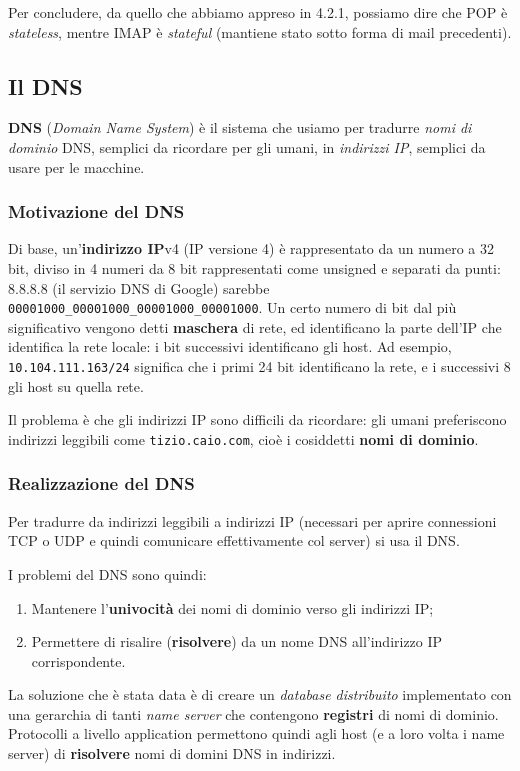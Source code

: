 \documentclass[a4paper,11pt]{article}
\begin{document}
Per concludere, da quello che abbiamo appreso in 4.2.1, possiamo dire che POP è \textit{stateless}, mentre IMAP è \textit{stateful} (mantiene stato sotto forma di mail precedenti). 

\subsection{Il DNS}
\textbf{DNS} (\textit{Domain Name System}) è il sistema che usiamo per tradurre \textit{nomi di dominio} DNS, semplici da ricordare per gli umani, in \textit{indirizzi IP}, semplici da usare per le macchine.

\subsubsection{Motivazione del DNS}
Di base, un'\textbf{indirizzo IP}v4 (IP versione 4) è rappresentato da un numero a 32 bit, diviso in 4 numeri da 8 bit rappresentati come unsigned e separati da punti: 8.8.8.8 (il servizio DNS di Google) sarebbe \lstinline|00001000_00001000_00001000_00001000|.
Un certo numero di bit dal più significativo vengono detti \textbf{maschera} di rete, ed identificano la parte dell'IP che identifica la rete locale: i bit successivi identificano gli host.
Ad esempio, \lstinline|10.104.111.163/24| significa che i primi 24 bit identificano la rete, e i successivi 8 gli host su quella rete. 

Il problema è che gli indirizzi IP sono difficili da ricordare: gli umani preferiscono indirizzi leggibili come \lstinline|tizio.caio.com|, cioè i cosiddetti \textbf{nomi di dominio}.

\subsubsection{Realizzazione del DNS}

Per tradurre da indirizzi leggibili a indirizzi IP (necessari per aprire connessioni TCP o UDP e quindi comunicare effettivamente col server) si usa il DNS.

I problemi del DNS sono quindi:
\begin{enumerate}
	\item Mantenere l'\textbf{univocità} dei nomi di dominio verso gli indirizzi IP;
	\item Permettere di risalire (\textbf{risolvere}) da un nome DNS all'indirizzo IP corrispondente.
\end{enumerate}

La soluzione che è stata data è di creare un \textit{database distribuito} implementato con una gerarchia di tanti \textit{name server} che contengono \textbf{registri} di nomi di dominio. Protocolli a livello application permettono quindi agli host (e a loro volta i name server) di \textbf{risolvere} nomi di domini DNS in indirizzi.
\end{document}
